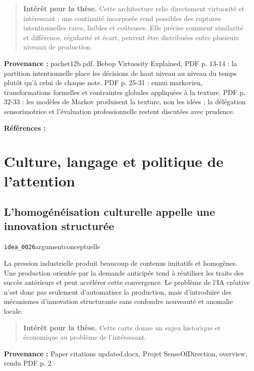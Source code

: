 \documentclass[10pt,a4paper]{article}
\begin{document}
\begin{quote}
\textbf{Intérêt pour la thèse.} Cette architecture relie directement virtuosité et intéressant : une continuité incorporée rend possibles des ruptures intentionnelles rares, lisibles et coûteuses. Elle précise comment similarité et différence, régularité et écart, peuvent être distribuées entre plusieurs niveaux de production.
\end{quote}
{\footnotesize\color{metadata}\textbf{Provenance :} pachet12b.pdf. Bebop Virtuosity Explained, PDF p. 13-14 : la partition intentionnelle place les décisions de haut niveau au niveau du temps plutôt qu'à celui de chaque note. PDF p. 25-31 : ennui markovien, transformations formelles et contraintes globales appliquées à la texture. PDF p. 32-33 : les modèles de Markov produisent la texture, non les idées ; la délégation sensorimotrice et l'évaluation professionnelle restent discutées avec prudence.\par}
{\footnotesize\color{metadata}\textbf{Références :} \parencite{pachet2012virtuosity}\par}

\section{Culture, langage et politique de l'attention}

\subsection{L'homogénéisation culturelle appelle une innovation structurée}
{\small\color{metadata} \texttt{idea\_0026}\quad\textbullet\quad argument\quad\textbullet\quad conceptuelle\par}

La pression industrielle produit beaucoup de contenus imitatifs et homogènes. Une production orientée par la demande anticipée tend à réutiliser les traits des succès antérieurs et peut accélérer cette convergence. Le problème de l'IA créative n'est donc pas seulement d'automatiser la production, mais d'introduire des mécanismes d'innovation structurante sans confondre nouveauté et anomalie locale.

\begin{quote}
\textbf{Intérêt pour la thèse.} Cette carte donne un enjeu historique et économique au problème de l'intéressant.
\end{quote}
{\footnotesize\color{metadata}\textbf{Provenance :} Paper citations updated.docx. Projet SenseOfDirection, overview, rendu PDF p. 2\par}
\end{document}
